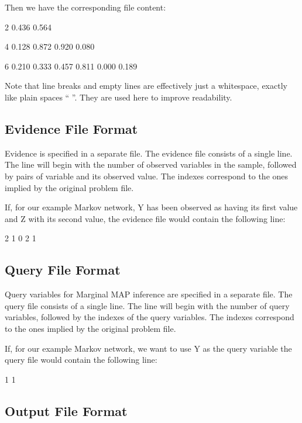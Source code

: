 Then we have the corresponding file content\+: \begin{DoxyVerb}    2
     0.436 0.564

    4
     0.128 0.872
     0.920 0.080

    6
     0.210 0.333 0.457
     0.811 0.000 0.189
\end{DoxyVerb}


Note that line breaks and empty lines are effectively just a whitespace, exactly like plain spaces “ ”. They are used here to improve readability.

\subsection*{Evidence File Format}

Evidence is specified in a separate file. The evidence file consists of a single line. The line will begin with the number of observed variables in the sample, followed by pairs of variable and its observed value. The indexes correspond to the ones implied by the original problem file.

If, for our example Markov network, {\ttfamily Y} has been observed as having its first value and {\ttfamily Z} with its second value, the evidence file would contain the following line\+: \begin{DoxyVerb}    2 1 0 2 1
\end{DoxyVerb}


\subsection*{Query File Format}

Query variables for Marginal M\+A\+P inference are specified in a separate file. The query file consists of a single line. The line will begin with the number of query variables, followed by the indexes of the query variables. The indexes correspond to the ones implied by the original problem file.

If, for our example Markov network, we want to use {\ttfamily Y} as the query variable the query file would contain the following line\+: \begin{DoxyVerb}    1 1
\end{DoxyVerb}


\subsection*{Output File Format}

